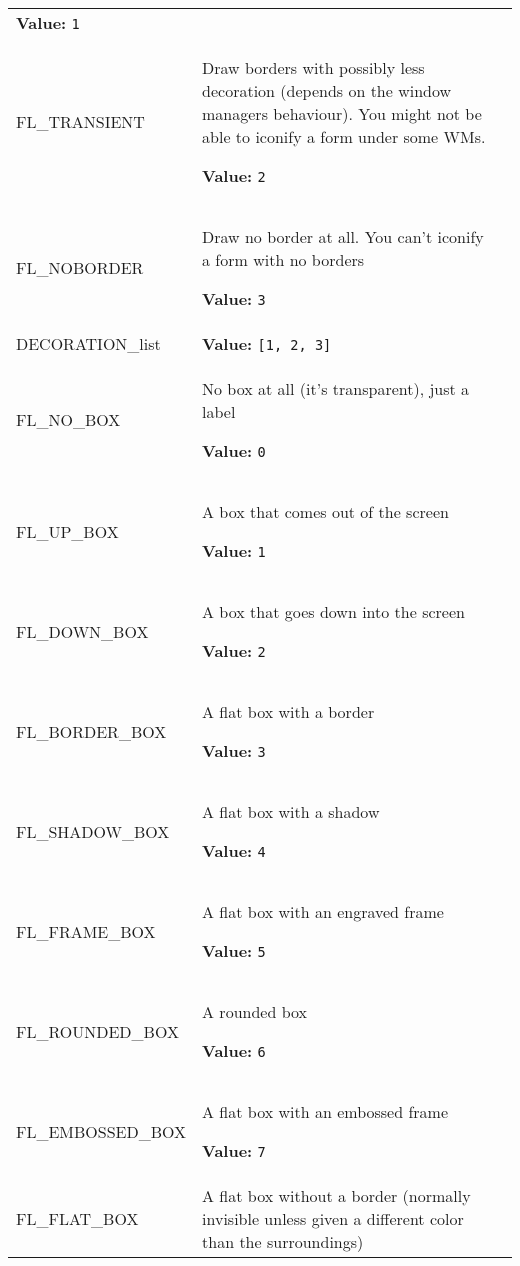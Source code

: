 \begin{longtable}{|p{\varnamewidth}|p{\vardescrwidth}|l}
\textbf{Value:} 
{\tt 1}&\\
\cline{1-2}
\raggedright F\-L\-\_\-T\-R\-A\-N\-S\-I\-E\-N\-T\- & \raggedright Draw borders with possibly less decoration (depends on the window
managers behaviour). You might not be able to iconify a form under
some WMs.

\textbf{Value:} 
{\tt 2}&\\
\cline{1-2}
\raggedright F\-L\-\_\-N\-O\-B\-O\-R\-D\-E\-R\- & \raggedright Draw no border at all. You can't iconify a form with no borders

\textbf{Value:} 
{\tt 3}&\\
\cline{1-2}
\raggedright D\-E\-C\-O\-R\-A\-T\-I\-O\-N\-\_\-l\-i\-s\-t\- & \raggedright \textbf{Value:} 
{\tt \texttt{[}1\texttt{, }2\texttt{, }3\texttt{]}}&\\
\cline{1-2}
\raggedright F\-L\-\_\-N\-O\-\_\-B\-O\-X\- & \raggedright No box at all (it's transparent), just a label

\textbf{Value:} 
{\tt 0}&\\
\cline{1-2}
\raggedright F\-L\-\_\-U\-P\-\_\-B\-O\-X\- & \raggedright A box that comes out of the screen

\textbf{Value:} 
{\tt 1}&\\
\cline{1-2}
\raggedright F\-L\-\_\-D\-O\-W\-N\-\_\-B\-O\-X\- & \raggedright A box that goes down into the screen

\textbf{Value:} 
{\tt 2}&\\
\cline{1-2}
\raggedright F\-L\-\_\-B\-O\-R\-D\-E\-R\-\_\-B\-O\-X\- & \raggedright A flat box with a border

\textbf{Value:} 
{\tt 3}&\\
\cline{1-2}
\raggedright F\-L\-\_\-S\-H\-A\-D\-O\-W\-\_\-B\-O\-X\- & \raggedright A flat box with a shadow

\textbf{Value:} 
{\tt 4}&\\
\cline{1-2}
\raggedright F\-L\-\_\-F\-R\-A\-M\-E\-\_\-B\-O\-X\- & \raggedright A flat box with an engraved frame

\textbf{Value:} 
{\tt 5}&\\
\cline{1-2}
\raggedright F\-L\-\_\-R\-O\-U\-N\-D\-E\-D\-\_\-B\-O\-X\- & \raggedright A rounded box

\textbf{Value:} 
{\tt 6}&\\
\cline{1-2}
\raggedright F\-L\-\_\-E\-M\-B\-O\-S\-S\-E\-D\-\_\-B\-O\-X\- & \raggedright A flat box with an embossed frame

\textbf{Value:} 
{\tt 7}&\\
\cline{1-2}
\raggedright F\-L\-\_\-F\-L\-A\-T\-\_\-B\-O\-X\- & \raggedright A flat box without a border (normally invisible unless given a
different color than the surroundings)


\end{longtable}
